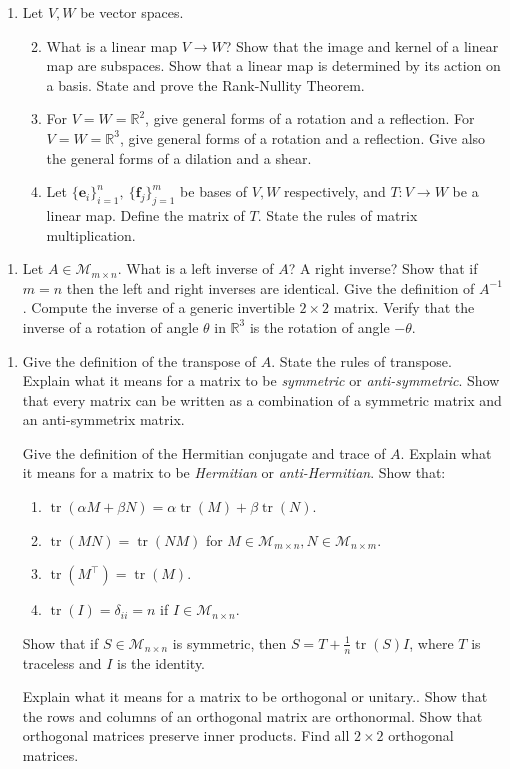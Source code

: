 \documentclass[11pt]{article}
\newcommand{\mcM}{\mathcal{M}}
\DeclareMathOperator{\tr}{tr}
\newlength{\qspace}
\newcounter{qnumber}
\newenvironment{question}%
 {\vspace{\qspace}
  \begin{enumerate}[\bfseries 1\quad][10]%
    \setcounter{enumi}{\value{qnumber}}%
    \item%
 }
{
  \end{enumerate}
  \filbreak
  \stepcounter{qnumber}
 }
\newenvironment{questionparts}[1][1]%
 {
  \begin{enumerate}[\bfseries (i)]%
    \setcounter{enumii}{#1}
    \addtocounter{enumii}{-1}
    \setlength{\parskip}{3pt}
 }
 {
  \end{enumerate}
 }
\begin{document}
\begin{question}
  Let $ V,W $ be vector spaces.
  \begin{questionparts}
    \item What is a linear map $ V \to W $? Show that the image and kernel of a linear map are subspaces. Show that a linear map is determined by its action on a basis. State and prove the Rank-Nullity Theorem.
    \item For $ V=W=\mathbb{R}^2 $, give general forms of a rotation and a reflection. For $ V=W=\mathbb{R}^{3} $, give general forms of a rotation and a reflection. Give also the general forms of a dilation and a shear.
    \item Let $ \{\mathbf{e}_i\}_{i=1}^n,\ \{\mathbf{f}_j\}_{j=1}^m $ be bases of $V,W$ respectively, and $T:V\to W$ be a linear map. Define the matrix of $T$. State the rules of matrix multiplication.
  \end{questionparts}
\end{question}
\newpage
\begin{question}
  Let $ A\in \mcM_{m \times n} $. What is a left inverse of $A$? A right inverse? Show that if $m=n$ then the left and right inverses are identical. Give the definition of $ A^{-1} $. Compute the inverse of a generic invertible $ 2 \times 2 $ matrix. Verify that the inverse of a rotation of angle $ \theta $ in $ \mathbb{R}^3 $ is the rotation of angle $ -\theta $.
\end{question}
\begin{question}
  Give the definition of the transpose of $A$. State the rules of transpose. Explain what it means for a matrix to be \textit{symmetric} or \textit{anti-symmetric}. Show that every matrix can be written as a combination of a symmetric matrix and an anti-symmetrix matrix.

  Give the definition of the Hermitian conjugate and trace of $A$. Explain what it means for a matrix to be \textit{Hermitian} or \textit{anti-Hermitian}. Show that:
  \begin{enumerate}[(1)]
    \item $ \tr(\alpha M+ \beta N)=\alpha \tr(M)+\beta \tr(N) $.
    \item $ \tr(MN)=\tr(NM) $ for $ M\in \mathcal{M}_{m\times n}, N\in \mathcal{M}_{n\times m} $.
    \item $ \tr(M^{\top})=\tr(M) $.
    \item $ \tr(I)=\delta_{ii}=n $ if $ I\in \mathcal{M}_{n\times n} $.
  \end{enumerate}
  Show that if $S\in \mcM_{n\times n}$ is symmetric, then $ S=T+\frac{1}{n}\tr(S) I $, where $T$ is traceless and $I$ is the identity.

  Explain what it means for a matrix to be orthogonal or unitary.. Show that the rows and columns of an orthogonal matrix are orthonormal. Show that orthogonal matrices preserve inner products. Find all $ 2\times 2 $ orthogonal matrices.
\end{question}
\end{document}
